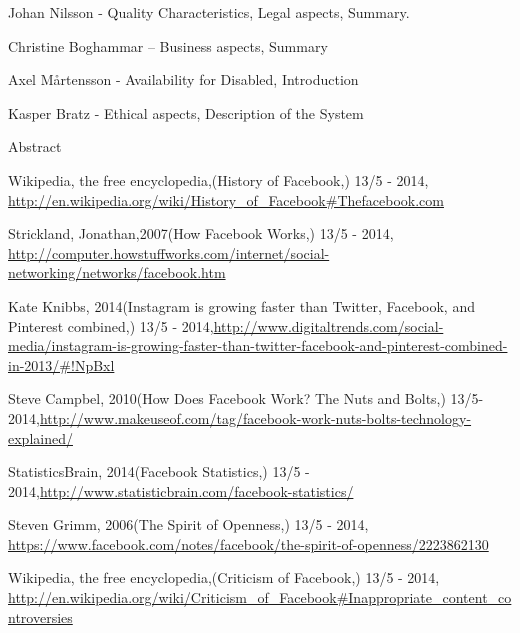 \documentclass[conference]{IEEEtran}
\begin{document}
Johan Nilsson - Quality
Characteristics, Legal aspects, Summary.

Christine Boghammar – Business aspects, Summary

Axel Mårtensson - Availability for Disabled, Introduction

Kasper Bratz - Ethical aspects, Description of the System

Abstract


\begin{thebibliography}{1}


Wikipedia, the free encyclopedia,(History of Facebook,) 13/5 - 2014,
\href{http://en.wikipedia.org/wiki/History\_of\_Facebook\#Thefacebook.com}{http://en.wikipedia.org/wiki/History\_of\_Facebook\#Thefacebook.com}

Strickland, Jonathan,2007(How Facebook Works,) 13/5 - 2014,
\href{http://computer.howstuffworks.com/internet/social-networking/networks/facebook.htm}{http://computer.howstuffworks.com/internet/social-networking/networks/facebook.htm}

Kate Knibbs,
2014(Instagram is growing faster than Twitter, Facebook, and Pinterest combined,) 13/5 - 2014,\href{http://www.digitaltrends.com/social-media/instagram-is-growing-faster-than-twitter-facebook-and-pinterest-combined-in-2013/\#!NpBxl}{http://www.digitaltrends.com/social-media/instagram-is-growing-faster-than-twitter-facebook-and-pinterest-combined-in-2013/\#!NpBxl}

Steve Campbel,
 2010(How Does Facebook Work? The Nuts and Bolts,) 13/5-2014,\href{http://www.makeuseof.com/tag/facebook-work-nuts-bolts-technology-explained/}{http://www.makeuseof.com/tag/facebook-work-nuts-bolts-technology-explained/}

StatisticsBrain,
2014(Facebook Statistics,) 13/5 - 2014,\href{http://www.statisticbrain.com/facebook-statistics/}{http://www.statisticbrain.com/facebook-statistics/}

Steven Grimm, 2006(The Spirit of Openness,) 13/5 - 2014, \href{https://www.facebook.com/notes/facebook/the-spirit-of-openness/2223862130}{https://www.facebook.com/notes/facebook/the-spirit-of-openness/2223862130}


Wikipedia, the free encyclopedia,(Criticism of Facebook,) 13/5 - 2014, \href{http://en.wikipedia.org/wiki/Criticism\_of\_Facebook\#Inappropriate\_content\_controversies}{http://en.wikipedia.org/wiki/Criticism\_of\_Facebook\#Inappropriate\_content\_controversies}


\end{thebibliography}
\end{document}
